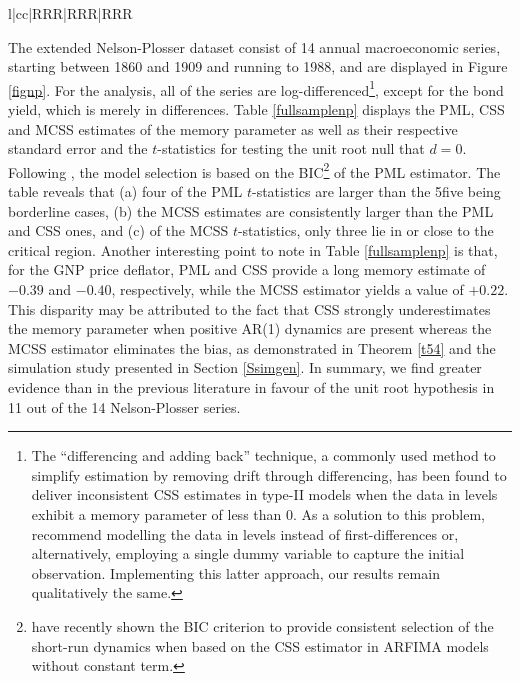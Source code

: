 {{\begin{table}[H]
{\begin{tabular}{l|cc|RRR|RRR|RRR}
\end{tabular}
}
\caption{Estimated ARFIMA models of the extended Nelson-Plosser data. The time series are transformed into log-differences, merely bond yields are only in differences. The second column shows the length $T$ of the individual series, the third
  column the model specifications based on the BIC for the profile maximum likelihood (PML) estimator. Subsequent columns then list the estimates of the memory parameter for PML, conditional sum-of-squares (CSS), and modified
      conditional sum-of-squares (MCSS). The empirical Hessian is used to calculate the standard errors, and the $t$-statistics are computed for the unit root null $H_0 \colon d=0$. The PML estimates are computed in R using the ‘arfima’ Package, see \textcite{R}.}
\label{fullsamplenp}
\end{table}

The extended Nelson-Plosser dataset consist of 14 annual macroeconomic series, starting between 1860 and 1909 and running to 1988, and are displayed in Figure \ref{fignp}. For the analysis, all of the series are log-differenced\footnote{The ``differencing and adding back'' technique, a
  commonly used method to simplify estimation by removing drift through differencing, has been found to deliver inconsistent CSS estimates in type-II models when the data in levels exhibit a memory parameter of less than 0. As a
  solution to this problem, \textcite{hualde2020truncated} recommend modelling the data in levels instead of first-differences or, alternatively, employing a single dummy variable to capture the initial observation. Implementing this latter approach, our results remain qualitatively the same.}, except for the bond yield, which is merely in differences. Table \ref{fullsamplenp} displays the PML, CSS and MCSS estimates of the memory parameter as well as their respective standard error and the $t$-statistics for testing the
unit root null that $d = 0$. Following \textcite{crato1994fractional}, the model selection is based on the BIC\footnote{\textcite{huang2022consistent} have recently shown the BIC criterion to provide consistent selection of the short-run
  dynamics when based on the CSS estimator in ARFIMA models without constant term.} of the PML estimator. The table reveals that (a) four of the PML $t$-statistics are larger than the 5\further five being borderline cases, (b) the MCSS estimates are consistently larger than the PML and CSS ones, and (c) of the MCSS $t$-statistics, only three lie in or close to the critical region. Another interesting point to note in Table
\ref{fullsamplenp} is that, for the GNP price deflator, PML and CSS provide a long memory estimate of $-0.39$ and $-0.40$, respectively, while the MCSS estimator yields a value of $+0.22$. This disparity may be attributed to the
fact that CSS strongly underestimates the memory parameter when positive AR(1) dynamics are present whereas the MCSS estimator eliminates the bias, as demonstrated in Theorem \ref{t54} and the simulation study presented in Section \ref{Ssimgen}. In summary,
we find greater evidence than in the previous literature in favour of the unit root hypothesis in 11 out of the 14 Nelson-Plosser series.

}}
